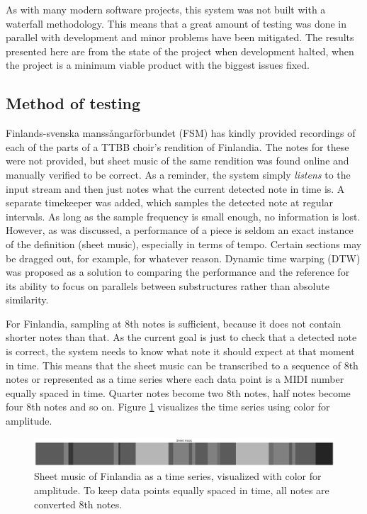 As with many modern software projects, this system was not built with a waterfall methodology. This means that a great amount of testing was done in parallel with development and minor problems have been mitigated. The results presented here are from the state of the project when development halted, when the project is a minimum viable product with the biggest issues fixed.

\subsection{Method of testing}
Finlands-svenska manssångarförbundet (FSM) has kindly provided recordings of each of the parts of a TTBB choir's rendition of Finlandia. The notes for these were not provided, but sheet music of the same rendition was found online and manually verified to be correct. As a reminder, the system simply \textit{listens} to the input stream and then just notes what the current detected note in time is. A separate timekeeper was added, which samples the detected note at regular intervals. As long as the sample frequency is small enough, no information is lost. However, as was discussed, a performance of a piece is seldom an exact instance of the definition (sheet music), especially in terms of tempo. Certain sections may be dragged out, for example, for whatever reason. Dynamic time warping (DTW) was proposed as a solution to comparing the performance and the reference for its ability to focus on parallels between substructures rather than absolute similarity.

For Finlandia, sampling at 8th notes is sufficient, because it does not contain shorter notes than that. As the current goal is just to check that a detected note is correct, the system needs to know what note it should expect at that moment in time. This means that the sheet music can be transcribed to a sequence of 8th notes or represented as a time series where each data point is a MIDI number equally spaced in time. Quarter notes become two 8th notes, half notes become four 8th notes and so on. Figure \ref{fig:sheetEncoding} visualizes the time series using color for amplitude.

\begin{figure}[ht]
    \centering
    \includegraphics[width=\textwidth]{./images/sheetEncoding.png}
    \caption{Sheet music of Finlandia as a time series, visualized with color for amplitude. To keep data points equally spaced in time, all notes are converted 8th notes. \label{fig:sheetEncoding}}
\end{figure}

